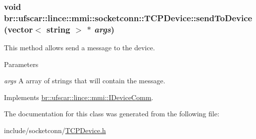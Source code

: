 \hypertarget{classbr_1_1ufscar_1_1lince_1_1mmi_1_1socketconn_1_1TCPDevice_a533e8c0d49d2418a244e46242dc70d99}{
\subsubsection[{sendToDevice}]{\setlength{\rightskip}{0pt plus 5cm}void br::ufscar::lince::mmi::socketconn::TCPDevice::sendToDevice (vector$<$ string $>$ $\ast$ {\em args})}}
\label{classbr_1_1ufscar_1_1lince_1_1mmi_1_1socketconn_1_1TCPDevice_a533e8c0d49d2418a244e46242dc70d99}


This method allows send a message to the device. 


\begin{DoxyParams}{Parameters}
\item[{\em args}]A array of strings that will contain the message. \end{DoxyParams}


Implements \hyperlink{classbr_1_1ufscar_1_1lince_1_1mmi_1_1IDeviceComm_a0249a13030b4df9b50778723421375d9}{br::ufscar::lince::mmi::IDeviceComm}.



The documentation for this class was generated from the following file:\begin{DoxyCompactItemize}
\item 
include/socketconn/\hyperlink{TCPDevice_8h}{TCPDevice.h}\end{DoxyCompactItemize}
